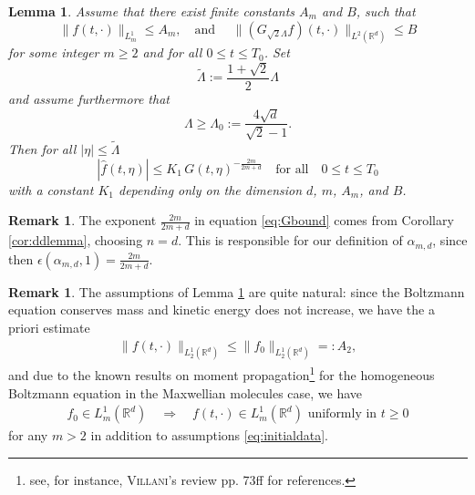 \documentclass[11pt,a4paper,reqno]{amsart}
\theoremstyle{plain}
\newtheorem{lemma}[proposition]{Lemma}
\theoremstyle{definition}
\newtheorem{remark}[proposition]{Remark}
\begin{document}
\begin{lemma} \label{lem:induction2}
    	Assume that there exist finite constants $A_m$ and $B$, such that
    	\begin{equation}\label{eq:ind2-assumption1}
    	\|f(t, \cdot)\|_{L^1_m} \leq A_m , \quad  \text{and } \quad 	\| (G_{\sqrt{2}\Lambda} f)(t, \cdot) \|_{L^2({\mathbb{R}}^d)} \le B
    	\end{equation}
    	for some integer $m\geq 2$ and for all $0\le t\le T_0$. Set
    	\begin{equation}\label{eq:ind2-tildeLambda}
    		\widetilde{\Lambda}:= \frac{1+\sqrt{2}}{2} \Lambda
    	\end{equation}
    	and assume furthermore that
    	\begin{equation}\label{eq:ind2-assumption2}
    		\Lambda\ge \Lambda_0 := \frac{4 \sqrt{d}}{\sqrt{2}-1}.
    	\end{equation}
    	Then for all $ |\eta|\le \widetilde{\Lambda}$
    	\begin{equation}\label{eq:Gbound}
    		|\hat{f}(t, \eta)| \leq K_1 \, G(t,\eta)^{-\frac{2m}{2m+d}} \quad \text{for all} \quad 0\leq t \leq T_0
    	\end{equation}
		with a constant $K_1$ depending only on the dimension $d$, $m$, $A_m$, and  $B$.
\end{lemma}

\begin{remark}\label{rem:choice_alpha}
The exponent $\frac{2m}{2m+d}$ in equation \eqref{eq:Gbound} comes from Corollary \ref{cor:ddlemma}, choosing $n=d$. This is responsible for our definition of $\alpha_{m,d}$, since then $\epsilon\left(\alpha_{m,d},1\right) = \frac{2m}{2m+d}$.
\end{remark}

\begin{remark} \label{rem:ind2}
 The assumptions of Lemma \ref{lem:induction2} are quite natural: since the Boltzmann equation conserves mass and kinetic energy does not increase, we have the a priori estimate
\begin{align*}
	\|f(t,\cdot)\|_{L^1_2({\mathbb{R}}^d)} \leq  \|f_0\|_{L^1_2({\mathbb{R}}^d)} =: A_2,
\end{align*}
and due to the known results on moment propagation\footnote{see, for instance,  \textsc{Villani}'s review \cite{Vil02} pp. 73ff for references.} for the homogeneous Boltzmann equation in the Maxwellian molecules case, we have
\begin{align*}
	f_0\in L^1_m({\mathbb{R}}^d) \quad \Longrightarrow \quad f(t,\cdot) \in L^1_m({\mathbb{R}}^d) \text{ uniformly in } t\ge 0
 \end{align*}
for any $m>2$ in addition to assumptions \eqref{eq:initialdata}.
\end{remark}
\end{document}
